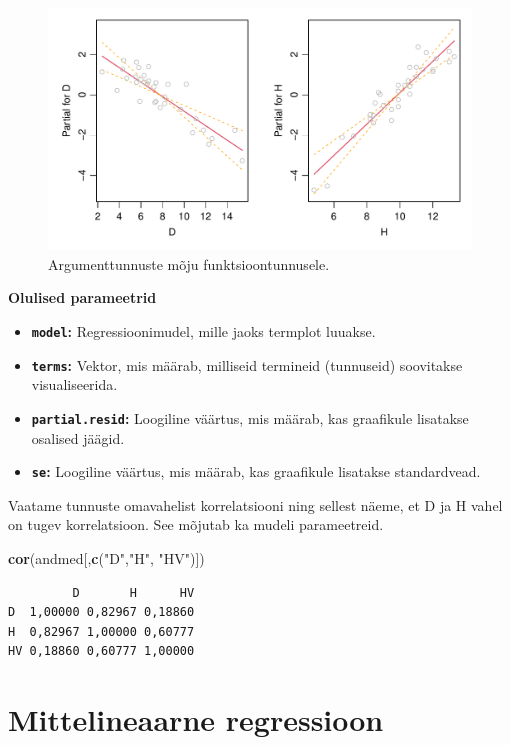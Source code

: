 \documentclass[
]{book}
\newenvironment{Shaded}{\begin{snugshade}}{\end{snugshade}}
\newcommand{\FunctionTok}[1]{\textcolor[rgb]{0.13,0.29,0.53}{\textbf{#1}}}
\newcommand{\NormalTok}[1]{#1}
\newcommand{\StringTok}[1]{\textcolor[rgb]{0.31,0.60,0.02}{#1}}
\providecommand{\tightlist}{%
  \setlength{\itemsep}{0pt}\setlength{\parskip}{0pt}}
\renewenvironment{Shaded} {\begin{snugshade}\footnotesize} {\end{snugshade}}
\begin{document}
\begin{figure}[H]
\includegraphics[width=0.8\linewidth]{_main_files/figure-latex/unnamed-chunk-56-1} \caption{Argumenttunnuste mõju funktsioontunnusele.}\label{fig:unnamed-chunk-56}
\end{figure}

\textbf{Olulised parameetrid}

\begin{itemize}
\tightlist
\item
  \textbf{\texttt{model}:} Regressioonimudel, mille jaoks termplot luuakse.
\item
  \textbf{\texttt{terms}:} Vektor, mis määrab, milliseid termineid (tunnuseid) soovitakse visualiseerida.
\item
  \textbf{\texttt{partial.resid}:} Loogiline väärtus, mis määrab, kas graafikule lisatakse osalised jäägid.
\item
  \textbf{\texttt{se}:} Loogiline väärtus, mis määrab, kas graafikule lisatakse standardvead.
\end{itemize}

Vaatame tunnuste omavahelist korrelatsiooni ning sellest näeme, et D ja H vahel on tugev korrelatsioon. See mõjutab ka mudeli parameetreid.

\begin{Shaded}
\begin{Highlighting}[]
\FunctionTok{cor}\NormalTok{(andmed[,}\FunctionTok{c}\NormalTok{(}\StringTok{"D"}\NormalTok{,}\StringTok{"H"}\NormalTok{, }\StringTok{"HV"}\NormalTok{)])}
\end{Highlighting}
\end{Shaded}

\begin{verbatim}
         D       H      HV
D  1,00000 0,82967 0,18860
H  0,82967 1,00000 0,60777
HV 0,18860 0,60777 1,00000
\end{verbatim}

\chapter{Mittelineaarne regressioon}\label{mittelineaarne-regressioon}
\end{document}
